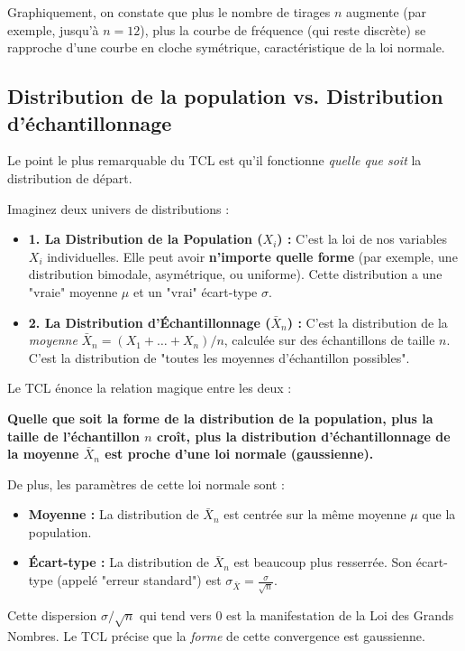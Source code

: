 \begin{examplebox}
\begin{center}
\end{center}

Graphiquement, on constate que plus le nombre de tirages $n$ augmente (par exemple, jusqu'à $n=12$), plus la courbe de fréquence (qui reste discrète) se rapproche d'une courbe en cloche symétrique, caractéristique de la loi normale.
\end{examplebox}

\subsection{Distribution de la population vs. Distribution d'échantillonnage}

Le point le plus remarquable du TCL est qu'il fonctionne \textit{quelle que soit} la distribution de départ.

\begin{intuitionbox}
Imaginez deux univers de distributions :

\begin{itemize}
    \item \textbf{1. La Distribution de la Population ($X_i$) :} C'est la loi de nos variables $X_i$ individuelles. Elle peut avoir \textbf{n'importe quelle forme} (par exemple, une distribution bimodale, asymétrique, ou uniforme). Cette distribution a une "vraie" moyenne $\mu$ et un "vrai" écart-type $\sigma$.
    
    \item \textbf{2. La Distribution d'Échantillonnage ($\bar{X}_n$) :} C'est la distribution de la \textit{moyenne} $\bar{X}_n = (X_1 + \dots + X_n)/n$, calculée sur des échantillons de taille $n$. C'est la distribution de "toutes les moyennes d'échantillon possibles".
\end{itemize}

Le TCL énonce la relation magique entre les deux :

\textbf{Quelle que soit la forme de la distribution de la population, plus la taille de l'échantillon $n$ croît, plus la distribution d'échantillonnage de la moyenne $\bar{X}_n$ est proche d'une loi normale (gaussienne).}

De plus, les paramètres de cette loi normale sont :
\begin{itemize}
    \item \textbf{Moyenne :} La distribution de $\bar{X}_n$ est centrée sur la même moyenne $\mu$ que la population.
    \item \textbf{Écart-type :} La distribution de $\bar{X}_n$ est beaucoup plus resserrée. Son écart-type (appelé "erreur standard") est $\sigma_{\bar{X}} = \frac{\sigma}{\sqrt{n}}$.
\end{itemize}
Cette dispersion $\sigma/\sqrt{n}$ qui tend vers 0 est la manifestation de la Loi des Grands Nombres. Le TCL précise que la \textit{forme} de cette convergence est gaussienne.
\end{intuitionbox}

